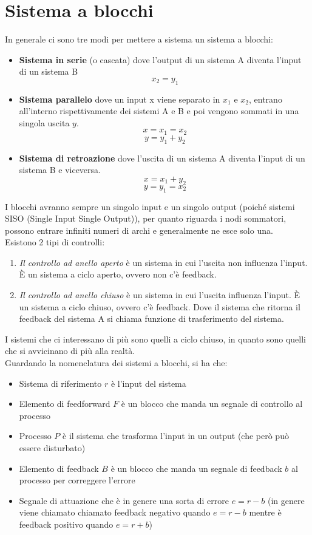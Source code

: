 \documentclass[a4paper]{article}
\begin{document}
\section{Sistema a blocchi}

In generale ci sono tre modi per mettere a sistema un sistema a blocchi:
\begin{itemize}
    \item \textbf{Sistema in serie} (o cascata) dove l'output di un sistema A diventa l'input di un sistema B
    \[x_2 = y_1\]
    \item \textbf{Sistema parallelo} dove un input x viene separato in $x_1$ e $x_2$, entrano all'interno rispettivamente
    dei sistemi A e B e poi vengono sommati in una singola uscita $y$.
    \[x = x_1 = x_2\]
    \[y = y_1 + y_2\]
    \item \textbf{Sistema di retroazione} dove l'uscita di un sistema A diventa l'input di un sistema B e viceversa.
    \[x= x_1 + y_2 \]
    \[y = y_1 = x_2\]
\end{itemize}
I blocchi avranno sempre un singolo input e un singolo output (poiché sistemi SISO (Single Input Single Output)), per quanto riguarda i nodi sommatori,
possono entrare infiniti numeri di archi e generalmente ne esce solo una.\\
Esistono 2 tipi di controlli:
\begin{enumerate}
    \item \textit{Il controllo ad anello aperto} è un sistema in cui l'uscita non influenza l'input. È un sistema a ciclo aperto, ovvero non c'è feedback.
    \item \textit{Il controllo ad anello chiuso} è un sistema in cui l'uscita influenza l'input. È un sistema a ciclo chiuso, ovvero c'è feedback.
    Dove il sistema che ritorna il feedback del sistema A si chiama funzione di trasferimento del sistema.
\end{enumerate}
I sistemi che ci interessano di più sono quelli a ciclo chiuso, in quanto sono quelli che si avvicinano di più alla realtà.\\
Guardando la nomenclatura dei sistemi a blocchi, si ha che:
\begin{itemize}
    \item Sistema di riferimento $r$ è l'input del sistema
    \item Elemento di feedforward $F$ è un blocco che manda un segnale di controllo al processo
    \item Processo $P$ è il sistema che trasforma l'input in un output (che però può essere disturbato)
    \item Elemento di feedback $B$ è un blocco che manda un segnale di feedback $b$ al processo per correggere l'errore 
    \item Segnale di attuazione che è in genere una sorta di errore $e = r - b$ (in genere viene chiamato 
    chiamato feedback negativo quando $e = r-b$ mentre è feedback positivo quando $e = r + b$)
\end{itemize}
\end{document}
